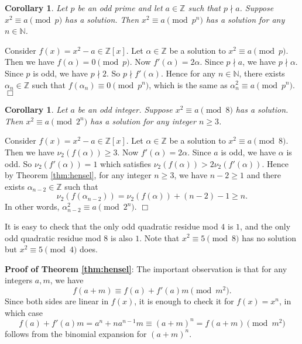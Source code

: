 \documentclass{article}
\def\Z{{\mathbb Z}}
\def\N{{\mathbb N}}
\def\Z{{\mathbb Z}}
\newtheorem{cor}[subsection]{Corollary}
\newenvironment{proof}{\noindent {\bf Proof:}}{$\Box$ \vspace{2 ex}}
\begin{document}
\begin{cor}\label{cor:p2n}
    Let $p$ be an odd prime and let $a\in\Z$ such that $p\nmid a$. Suppose $x^2\equiv a\pmod{p}$ has a solution. Then $x^2\equiv a\pmod{p^n}$ has a solution for any $n\in\N$.
\end{cor}

\begin{proof}
    Consider $f(x) = x^2 - a \in\Z[x]$. Let $\alpha\in\Z$ be a solution to $x^2 \equiv a\pmod{p}$. Then we have $f(\alpha) = 0\pmod{p}$. Now $f'(\alpha) = 2\alpha$. Since $p\nmid a$, we have $p\nmid \alpha$. Since $p$ is odd, we have $p\nmid 2$. So $p\nmid f'(\alpha)$. Hence for any $n\in\N$, there exists $\alpha_n\in\Z$ such that $f(\alpha_n)\equiv 0\pmod{p^n}$, which is the same as $\alpha_n^2 \equiv a\pmod{p^n}.$
\end{proof}

\begin{cor}
    Let $a$ be an odd integer. Suppose $x^2\equiv a\pmod{8}$ has a solution. Then $x^2\equiv a\pmod{2^n}$ has a solution for any integer $n\geq 3$.
\end{cor}

\begin{proof}
    Consider $f(x) = x^2 - a \in\Z[x]$. Let $\alpha\in\Z$ be a solution to $x^2 \equiv a\pmod{8}$. Then we have $\nu_2(f(\alpha))\geq 3$. Now $f'(\alpha) = 2\alpha$. Since $a$ is odd, we have $\alpha$ is odd. So $\nu_2(f'(\alpha)) = 1$ which satisfies $\nu_2(f(\alpha)) > 2\nu_2(f'(\alpha))$.  Hence by Theorem \ref{thm:hensel}, for any integer $n\geq 3$, we have $n-2\geq 1$ and there exists $\alpha_{n-2}\in\Z$ such that $$\nu_2(f(\alpha_{n-2})) = \nu_2(f(\alpha)) + (n-2)-1 \geq n.$$
    In other words, $\alpha_{n-2}^2\equiv a\pmod{2^n}.$
\end{proof}

It is easy to check that the only odd quadratic residue mod $4$ is $1$, and the only odd quadratic residue mod $8$ is also $1$. Note that $x^2 \equiv 5\pmod{8}$ has no solution but $x^2 \equiv 5\pmod{4}$ does.

\vspace{5pt}
\noindent\textbf{Proof of Theorem \ref{thm:hensel}}: The important observation is that for any integers $a,m$, we have
$$f(a + m) \equiv f(a) + f'(a)m\pmod{m^2}.$$
Since both sides are linear in $f(x)$, it is enough to check it for $f(x) = x^n$, in which case $$f(a) + f'(a)m = a^n + na^{n-1}m\equiv (a+m)^n = f(a+m)\pmod{m^2}$$ follows from the binomial expansion for $(a+m)^n$.
\end{document}
